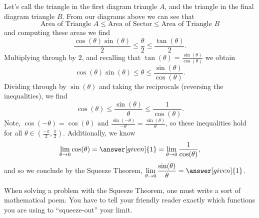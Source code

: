 \documentclass{ximera}
\begin{document}
\begin{example}
\begin{explanation}
Let's call the triangle in the first diagram triangle $A$, and the triangle in the final diagram triangle $B$.  From our diagrams above we can see that
\[
\text{Area of Triangle $A$} \le \text{Area of Sector} \le \text{Area of Triangle $B$}
\]
and computing these areas we find
\[
\frac{\cos(\theta)\sin(\theta)}{2} \le \frac{\theta}{2} \le \frac{\tan(\theta)}{2}.
\]
Multiplying through by $2$, and recalling that $\tan(\theta) =
\frac{\sin(\theta)}{\cos(\theta)}$ we obtain
\[
\cos(\theta)\sin(\theta) \le \theta \le \frac{\sin(\theta)}{\cos(\theta)}.
\]
Dividing through by $\sin(\theta)$ and taking the reciprocals
(reversing the inequalities), we find
\[
\cos(\theta) \le \frac{\sin(\theta)}{\theta} \le \frac{1}{\cos(\theta)}.
\]
Note, $\cos(-\theta) = \cos(\theta)$ and $\frac{\sin(-\theta)}{-\theta} =
\frac{\sin(\theta)}{\theta}$, so these inequalities hold for all $\theta\in
\left(\frac{-\pi}{2}, \frac{\pi}{2}\right)$.  Additionally, we know
\[
\lim_{\theta \to 0}\cos(\theta) = \answer[given]{1} = \lim_{\theta\to 0}\frac{1}{\cos(\theta)},
\]
and so we conclude by the Squeeze Theorem, $\displaystyle\lim_{\theta \to
  0}\frac{\sin(\theta)}{\theta} = \answer[given]{1}$.
\end{explanation}
\end{example}

When solving a problem with the Squeeze Theorem, one must write a sort
of mathematical poem. You have to tell your friendly reader exactly
which functions you are using to ``squeeze-out'' your limit.
\end{document}
